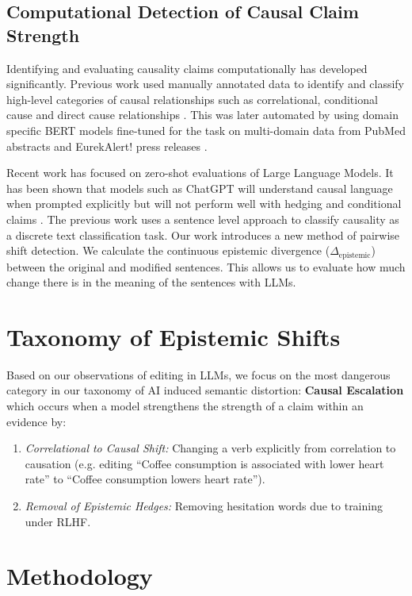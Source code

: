 \documentclass[acmsmall]{acmart}
\begin{document}
\subsection{Computational Detection of Causal Claim Strength}
Identifying and evaluating causality claims computationally has developed significantly. Previous work used manually annotated data to identify and classify high-level categories of causal relationships such as correlational, conditional cause and direct cause relationships \cite{sumner2014association}. This was later automated by using domain specific BERT models fine-tuned for the task on multi-domain data from PubMed abstracts and EurekAlert! press releases \cite{yu2019detecting, yu2020measuring}.

Recent work has focused on zero-shot evaluations of Large Language Models. It has been shown that models such as ChatGPT will understand causal language when prompted explicitly but will not perform well with hedging and conditional claims \cite{kim2023chatgpt}. The previous work uses a sentence level approach to classify causality as a discrete text classification task. Our work introduces a new method of pairwise shift detection. We calculate the continuous epistemic divergence ($\Delta_{\text{epistemic}}$) between the original and modified sentences. This allows us to evaluate how much change there is in the meaning of the sentences with LLMs.

\section{Taxonomy of Epistemic Shifts}

Based on our observations of editing in LLMs, we focus on the most dangerous category in our taxonomy of AI induced semantic distortion: \textbf{Causal Escalation} which occurs when a model strengthens the strength of a claim within an evidence by:

\begin{enumerate}
    \item \textit{Correlational to Causal Shift:} Changing a verb explicitly from correlation to causation (e.g. editing ``Coffee consumption is associated with lower heart rate'' to ``Coffee consumption lowers heart rate'').
    \item \textit{Removal of Epistemic Hedges:} Removing hesitation words due to training under RLHF.
\end{enumerate}

\section{Methodology}
\end{document}
